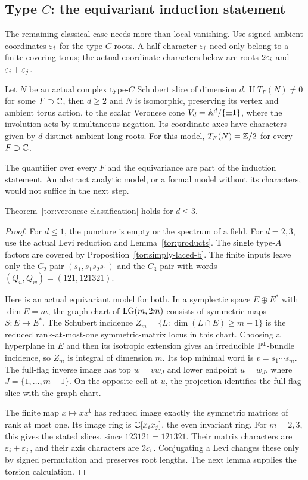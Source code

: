 \subsection{Type \texorpdfstring{$C$}{C}: the equivariant induction statement}
The remaining classical case needs more than local vanishing. Use signed ambient coordinates $\varepsilon_i$ for the type-$C$ roots. A half-character $\varepsilon_i$ need only belong to a finite covering torus; the actual coordinate characters below are roots $2\varepsilon_i$ and $\varepsilon_i+\varepsilon_j$.

\begin{theorem}\label{tor:veronese-classification}
Let $N$ be an actual complex type-$C$ Schubert slice of dimension $d$. If $T_F(N)\ne0$ for some $F\supset\mathbb C$, then $d\ge2$ and $N$ is isomorphic, preserving its vertex and ambient torus action, to the scalar Veronese cone $V_d=\mathbb A^d/\{\pm1\}$, where the involution acts by simultaneous negation. Its coordinate axes have characters given by $d$ distinct ambient long roots. For this model, $T_F(N)=\mathbb Z/2$ for every $F\supset\mathbb C$.
\end{theorem}

The quantifier over every $F$ and the equivariance are part of the induction statement. An abstract analytic model, or a formal model without its characters, would not suffice in the next step.

\begin{lemma}\label{tor:veronese-base}
Theorem~\ref{tor:veronese-classification} holds for $d\le3$.
\end{lemma}
\begin{proof}
For $d\le1$, the puncture is empty or the spectrum of a field. For $d=2,3$, use the actual Levi reduction and Lemma~\ref{tor:products}. The single type-$A$ factors are covered by Proposition~\ref{tor:simply-laced-b}. The finite inputs leave only the $C_2$ pair $(s_1,s_1s_2s_1)$ and the $C_3$ pair with words $(Q_u,Q_w)=(121,121321)$.

Here is an actual equivariant model for both. In a symplectic space $E\oplus E^*$ with $\dim E=m$, the graph chart of $\operatorname{LG}(m,2m)$ consists of symmetric maps $S:E\longrightarrow E^*$. The Schubert incidence $Z_m=\{L:\dim(L\cap E)\ge m-1\}$ is the reduced rank-at-most-one symmetric-matrix locus in this chart. Choosing a hyperplane in $E$ and then its isotropic extension gives an irreducible $\mathbb P^1$-bundle incidence, so $Z_m$ is integral of dimension $m$. Its top minimal word is $v=s_1\cdots s_m$. The full-flag inverse image has top $w=vw_J$ and lower endpoint $u=w_J$, where $J=\{1,\ldots,m-1\}$. On the opposite cell at $u$, the projection identifies the full-flag slice with the graph chart.

The finite map $x\longmapsto xx^{\mathsf t}$ has reduced image exactly the symmetric matrices of rank at most one. Its image ring is $\mathbb C[x_ix_j]$, the even invariant ring. For $m=2,3$, this gives the stated slices, since $123121=121321$. Their matrix characters are $\varepsilon_i+\varepsilon_j$, and their axis characters are $2\varepsilon_i$. Conjugating a Levi changes these only by signed permutation and preserves root lengths. The next lemma supplies the torsion calculation.
\end{proof}


